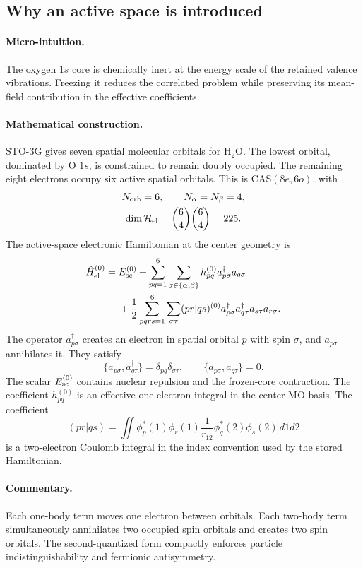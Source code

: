 \documentclass[10pt,twocolumn]{article}
\newcommand{\micro}{\paragraph{Micro-intuition.}}
\newcommand{\mathderiv}{\paragraph{Mathematical construction.}}
\newcommand{\commentaryblock}{\paragraph{Commentary.}}
\begin{document}
\subsection*{Why an active space is introduced}

\micro The oxygen $1s$ core is chemically inert at the energy scale of the
retained valence vibrations.  Freezing it reduces the correlated problem while
preserving its mean-field contribution in the effective coefficients.

\mathderiv STO-3G gives seven spatial molecular orbitals for H$_2$O.  The
lowest orbital, dominated by O $1s$, is constrained to remain doubly occupied.
The remaining eight electrons occupy six active spatial orbitals.  This is
CAS$(8e,6o)$, with
\begin{equation}
\begin{gathered}
N_{\rm orb}=6,\qquad N_\alpha=N_\beta=4,\\
\dim\mathcal H_{\rm el}=\binom64\binom64=225.
\end{gathered}
\label{eq:cas-dimension}
\end{equation}
The active-space electronic Hamiltonian at the center geometry is
\begin{align}
\hat H_{\rm el}^{(0)}={}&E_{\rm sc}^{(0)}
+\sum_{pq=1}^{6}\sum_{\sigma\in\{\alpha,\beta\}}
h_{pq}^{(0)}a_{p\sigma}^\dagger a_{q\sigma}\nonumber\\
&+\frac12\sum_{pqrs=1}^{6}\sum_{\sigma\tau}
(pr|qs)^{(0)}
a_{p\sigma}^\dagger a_{q\tau}^\dagger
a_{s\tau}a_{r\sigma}.
\label{eq:active-hamiltonian}
\end{align}
The operator $a_{p\sigma}^\dagger$ creates an electron in spatial orbital $p$
with spin $\sigma$, and $a_{p\sigma}$ annihilates it.  They satisfy
\begin{equation}
\{a_{p\sigma},a_{q\tau}^\dagger\}=\delta_{pq}\delta_{\sigma\tau},
\qquad
\{a_{p\sigma},a_{q\tau}\}=0.
\label{eq:fermion-algebra}
\end{equation}
The scalar $E_{\rm sc}^{(0)}$ contains nuclear repulsion and the frozen-core
contraction.  The coefficient $h_{pq}^{(0)}$ is an effective one-electron
integral in the center MO basis.  The coefficient
\begin{equation}
(pr|qs)=\iint \phi_p^*(1)\phi_r(1)\frac1{r_{12}}
\phi_q^*(2)\phi_s(2)\,d1d2
\label{eq:mo-eri}
\end{equation}
is a two-electron Coulomb integral in the index convention used by the stored
Hamiltonian.

\commentaryblock Each one-body term moves one electron between orbitals.  Each
two-body term simultaneously annihilates two occupied spin orbitals and
creates two spin orbitals.  The second-quantized form compactly enforces
particle indistinguishability and fermionic antisymmetry.
\end{document}
